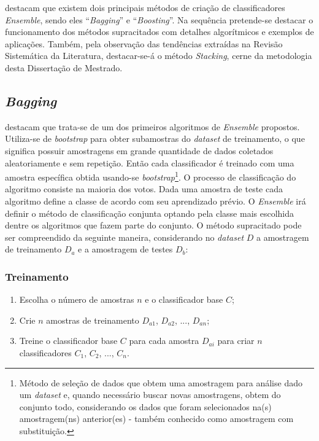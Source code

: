  destacam que existem dois principais métodos de criação de classificadores \textit{Ensemble}, sendo eles ``\textit{Bagging}'' e ``\textit{Boosting}''. Na sequência pretende-se destacar o funcionamento dos métodos supracitados com detalhes algorítmicos e exemplos de aplicações. Também, pela observação das tendências extraídas na Revisão Sistemática da Literatura, destacar-se-á o método \textit{Stacking}, cerne da metodologia desta Dissertação de Mestrado.


\subsection{\textit{Bagging}}
 destacam que trata-se de um dos primeiros algoritmos de \textit{Ensemble} propostos. Utiliza-se de \textit{bootstrap} para obter subamostras do \textit{dataset} de treinamento, o que significa possuir amostragens em grande quantidade de dados coletados aleatoriamente e sem repetição. Então cada classificador é treinado com uma amostra específica obtida usando-se \textit{bootstrap}\footnote{Método de seleção de dados que obtem uma amostragem para análise dado um \textit{dataset} e, quando necessário buscar novas amostragens, obtem do conjunto todo, considerando os dados que foram selecionados na(s) amostragem(ns) anterior(es) - também conhecido como amostragem com substituição.}. O processo de classificação do algoritmo consiste na maioria dos votos. Dada uma amostra de teste cada algoritmo define a classe de acordo com seu aprendizado prévio. O \textit{Ensemble} irá definir o método de classificação conjunta optando pela classe mais escolhida dentre os algoritmos que fazem parte do conjunto. O método supracitado pode ser compreendido da seguinte maneira, considerando no \textit{dataset} \textbf{$D$} a amostragem de treinamento \textbf{$D_a$} e a amostragem de testes \textbf{$D_b$}:



\subsubsection*{Treinamento}

\begin{enumerate}
    \item Escolha o número de amostras \textbf{$n$} e o classificador base \textbf{$C$};
    \item Crie \textbf{$n$} amostras de treinamento \textbf{$D_{a1}$}, \textbf{$D_{a2}$}, ..., \textbf{$D_{an}$};
    \item Treine o classificador base \textbf{$C$} para cada amostra \textbf{$D_{ai}$} para criar \textbf{$n$} classificadores \textbf{$C_1$}, \textbf{$C_2$}, ..., \textbf{$C_n$}.
\end{enumerate}

